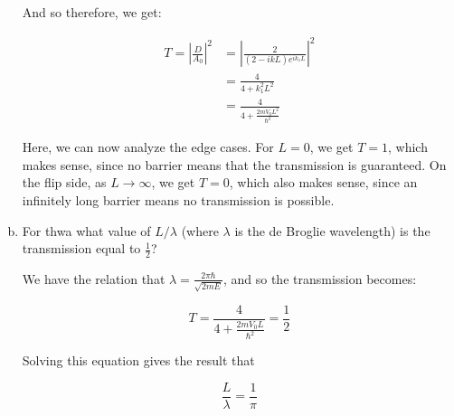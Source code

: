 \documentclass[10pt]{article}
\begin{document}
\begin{enumerate}[(a)]
\begin{solution}
            And so therefore, we get: 

            \begin{align*}
                T = \left|\frac{D}{A_0}\right|^2 &= \left|\frac{2}{(2 - ikL)e^{ik_1L}}\right|^2\\
                &= \frac{4}{4 + k_1^2L^2}\\
                &= \frac{4}{4 + \frac{2mV_0L^2}{\hbar^2}}
            \end{align*} 

            Here, we can now analyze the edge cases. For $L = 0$, we get $T = 1$, which makes sense, since no barrier means that the transmission is guaranteed. On the flip side, as $L \to \infty$, we get $T = 0$, which also makes sense, since an infinitely long barrier means no transmission is possible. 
        \end{solution}
        \item For thwa what value of $L/\lambda$ (where $\lambda$ is the de Broglie wavelength) is the transmission equal to $\frac 12$?
        

        \begin{solution}
            We have the relation that $\lambda = \frac{2\pi\hbar}{\sqrt{2mE}}$, and so the transmission becomes: 

            \[ T = \frac{4}{4 + \frac{2mV_0L}{\hbar^2}} = \frac{1}{2}\] 

            Solving this equation gives the result that 

            \[ \frac{L}{\lambda} = \frac{1}{\pi}\] 
        \end{solution}
    \end{enumerate}
\end{document}
